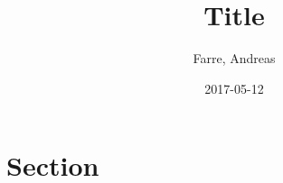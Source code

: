 \documentclass[a4paper,11pt]{article}
\title{Title}
\author{Farre, Andreas}
\date{2017-05-12}
\begin{document}
\maketitle

\section{Section}

\begin{verbatim}

\end{verbatim}
\end{document}

